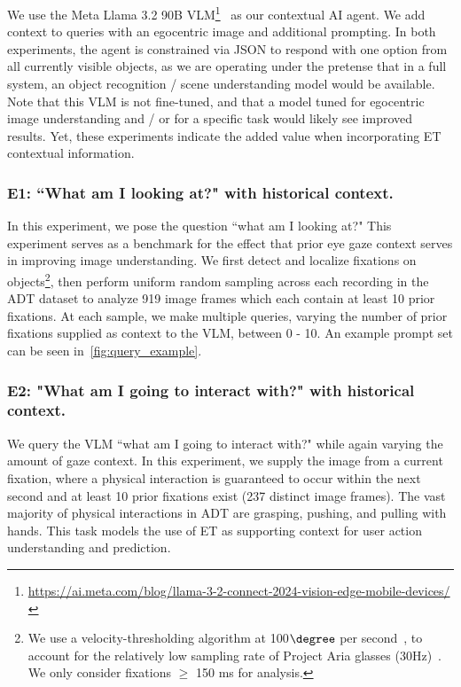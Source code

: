 We use the Meta Llama 3.2 90B VLM\footnote{\url{https://ai.meta.com/blog/llama-3-2-connect-2024-vision-edge-mobile-devices/}}~\cite{grattafiori_llama_2024} as our contextual AI agent.  We add context to queries with an egocentric image and additional prompting.  In both experiments, the agent is constrained via JSON to respond with one option from all currently visible objects, as we are operating under the pretense that in a full system, an object recognition / scene understanding model would be available.  Note that this VLM is not fine-tuned, and that a model tuned for egocentric image understanding and / or for a specific task would likely see improved results.  Yet, these experiments indicate the added value when incorporating ET contextual information.

\subsubsection{E1: ``What am I looking at?" with historical context.}

In this experiment, we pose the question ``what am I looking at?"  This experiment serves as a benchmark for the effect that prior eye gaze context serves in improving image understanding.  We first detect and localize fixations on objects\footnote{We use a velocity-thresholding algorithm at 100$\degree$ per second~\cite{salvucci_fixations_2000}, to account for the relatively low sampling rate of Project Aria glasses (30Hz)~\cite{engel_aria_2023}.  We only consider fixations $\geq$ 150 ms for analysis.}, then perform uniform random sampling across each recording in the ADT dataset to analyze 919 image frames which each contain at least 10 prior fixations.  At each sample, we make multiple queries, varying the number of prior fixations supplied as context to the VLM, between 0 - 10.  An example prompt set can be seen in~\autoref{fig:query_example}.

\subsubsection{E2: "What am I going to interact with?" with historical context.}

We query the VLM ``what am I going to interact with?" while again varying the amount of gaze context.  In this experiment, we supply the image from a current fixation, where a physical interaction is guaranteed to occur within the next second and at least 10 prior fixations exist (237 distinct image frames).  The vast majority of physical interactions in ADT are grasping, pushing, and pulling with hands.  This task models the use of ET as supporting context for user action understanding and prediction.


